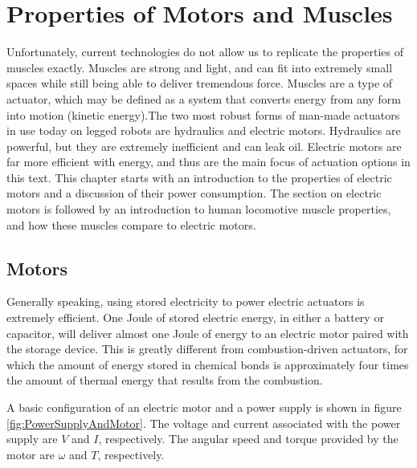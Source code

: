 
\chapter{Properties of Motors and Muscles}
\label{sec:PropertiesOfMotorsAndMuscles}

Unfortunately, current technologies do not allow us to replicate the properties of muscles exactly. Muscles are strong and light, and can fit into extremely small spaces while still being able to deliver tremendous force. Muscles are a type of actuator, which may be defined as a system that converts energy from any form into motion (kinetic energy).The two most robust forms of man-made actuators in use today on legged robots are hydraulics and electric motors. Hydraulics are powerful, but they are extremely inefficient and can leak oil. Electric motors are far more efficient with energy, and thus are the main focus of actuation options in this text. This chapter starts with an introduction to the properties of electric motors and a discussion of their power consumption. The section on electric motors is followed by an introduction to human locomotive muscle properties, and how these muscles compare to electric motors.

\section{Motors} %
\label{IntroductionToMotors}

Generally speaking, using stored electricity to power electric actuators is extremely efficient. One \unit{Joule} of stored electric energy, in either a battery or capacitor, will deliver almost one \unit{Joule} of energy to an electric motor paired with the storage device. This is greatly different from combustion-driven actuators, for which the amount of energy stored in chemical bonds is approximately four times the amount of thermal energy that results from the combustion.
\par %
A basic configuration of an electric motor and a power supply is shown in figure \ref{fig:PowerSupplyAndMotor}. The voltage and current associated with the power supply are $V$ and $I$, respectively. The angular speed and torque provided by the motor are $\omega$ and $T$, respectively.

